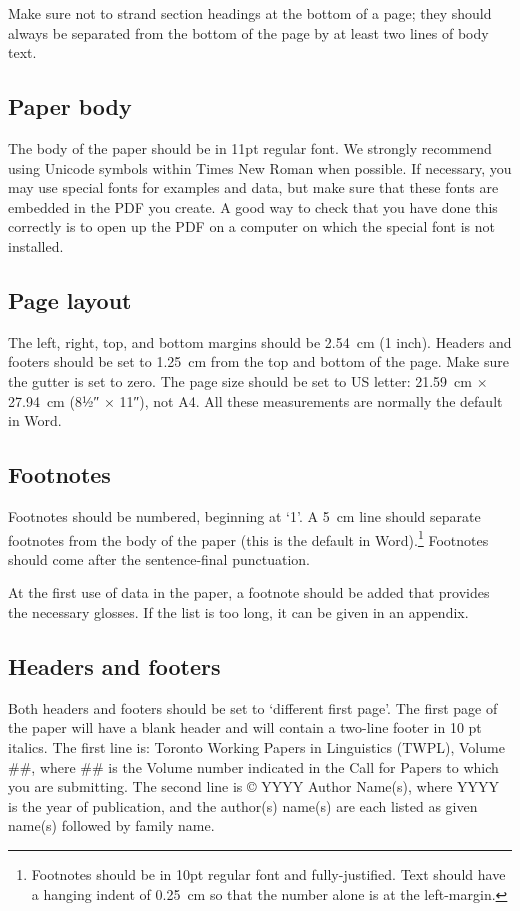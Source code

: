 \documentclass[xelatex,linguex]{TWPL}
\begin{document}
Make sure not to strand section headings at the bottom of a page; they should always be separated from the bottom of the page by at least two lines of body text. %

\subsection{Paper body}

The body of the paper should be in 11pt regular font. We strongly recommend using Unicode symbols within Times New Roman when possible. If necessary, you may use special fonts for examples and data, but make sure that these fonts are embedded in the PDF you create. A good way to check that you have done this correctly is to open up the PDF on a computer on which the special font is not installed.

\subsection{Page layout}

The left, right, top, and bottom margins should be 2.54~cm (1 inch). Headers and footers should be set to 1.25~cm from the top and bottom of the page. Make sure the gutter is set to zero. The page size should be set to US letter: 21.59~cm × 27.94~cm (8½″ × 11″), not A4. All these measurements are normally the default in Word.

\subsection{Footnotes}

Footnotes should be numbered, beginning at `1'. A 5~cm line should separate footnotes from the body of the paper (this is the default in Word).\footnote{Footnotes should be in 10pt regular font and fully-justified. Text should have a hanging indent of 0.25~cm so that the number alone is at the left-margin.}  Footnotes should come after the sentence-final punctuation.

At the first use of data in the paper, a footnote should be added that provides the necessary glosses. If the list is too long, it can be given in an appendix.

\subsection{Headers and footers}

Both headers and footers should be set to `different first page'. The first page of the paper will have a blank header and will contain a two-line footer in 10 pt italics. The first line is: Toronto Working Papers in Linguistics (TWPL), Volume \#\#, where \#\# is the Volume number indicated in the Call for Papers to which you are submitting. The second line is © YYYY Author Name(s), where YYYY is the year of publication, and the author(s) name(s) are each listed as given name(s) followed by family name.
\end{document}

